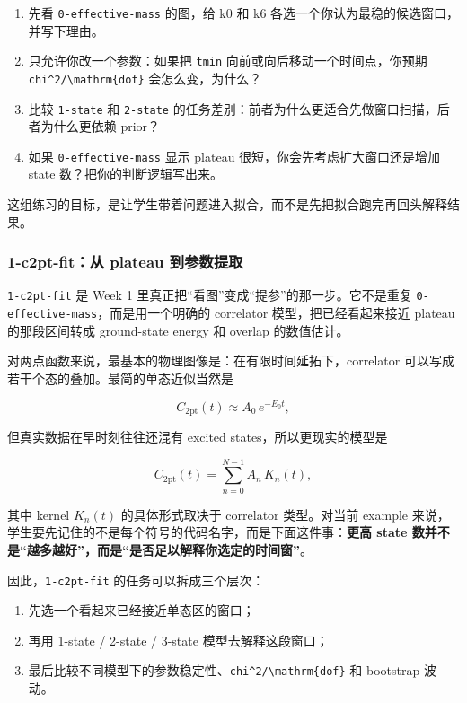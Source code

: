\documentclass[11pt,a4paper,fontset=fandol]{ctexart}
\begin{document}
\begin{enumerate}[leftmargin=2em]
  \item 先看 \lstinline|0-effective-mass| 的图，给 k0 和 k6 各选一个你认为最稳的候选窗口，并写下理由。
  \item 只允许你改一个参数：如果把 \lstinline|tmin| 向前或向后移动一个时间点，你预期 \lstinline|chi^2/\mathrm{dof}| 会怎么变，为什么？
  \item 比较 \lstinline|1-state| 和 \lstinline|2-state| 的任务差别：前者为什么更适合先做窗口扫描，后者为什么更依赖 prior？
  \item 如果 \lstinline|0-effective-mass| 显示 plateau 很短，你会先考虑扩大窗口还是增加 state 数？把你的判断逻辑写出来。
\end{enumerate}

这组练习的目标，是让学生带着问题进入拟合，而不是先把拟合跑完再回头解释结果。

\subsubsection{1-c2pt-fit：从 plateau 到参数提取}

\lstinline|1-c2pt-fit| 是 Week 1 里真正把“看图”变成“提参”的那一步。它不是重复 \lstinline|0-effective-mass|，而是用一个明确的 correlator 模型，把已经看起来接近 plateau 的那段区间转成 ground-state energy 和 overlap 的数值估计。

对两点函数来说，最基本的物理图像是：在有限时间延拓下，correlator 可以写成若干个态的叠加。最简的单态近似当然是

\begin{equation}
C_{2\mathrm{pt}}(t) \approx A_0\,e^{-E_0 t},
\end{equation}

但真实数据在早时刻往往还混有 excited states，所以更现实的模型是

\begin{equation}
C_{2\mathrm{pt}}(t) = \sum_{n=0}^{N-1} A_n\,K_n(t),
\end{equation}

其中 kernel \(K_n(t)\) 的具体形式取决于 correlator 类型。对当前 example 来说，学生要先记住的不是每个符号的代码名字，而是下面这件事：\textbf{更高 state 数并不是“越多越好”，而是“是否足以解释你选定的时间窗”}。

因此，\lstinline|1-c2pt-fit| 的任务可以拆成三个层次：

\begin{enumerate}[leftmargin=2em]
  \item 先选一个看起来已经接近单态区的窗口；
  \item 再用 1-state / 2-state / 3-state 模型去解释这段窗口；
  \item 最后比较不同模型下的参数稳定性、\lstinline|chi^2/\mathrm{dof}| 和 bootstrap 波动。
\end{enumerate}
\end{document}
